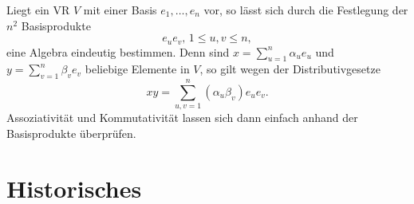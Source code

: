 \documentclass[aspectratio=169]{beamer}
\begin{document}
    \begin{frame}
        Liegt ein VR \(V\) mit einer Basis \(e_1, \dots, e_n\) vor, so lässt sich durch die Festlegung der \(n^2\) Basisprodukte
        \[
        e_u e_v,\, 1 \leq u, v \leq n,
        \]
        eine Algebra eindeutig bestimmen.
        Denn sind \(x = \sum_{u=1}^{n} \alpha_u e_u\) und  \(y = \sum_{v=1}^{n} \beta_v e_v\) beliebige Elemente in \(V\), so gilt wegen der Distributivgesetze
        \[
            xy = \sum_{u,v=1}^{n} (\alpha_u \beta_v) e_u e_v
        .\]
        Assoziativität und Kommutativität lassen sich dann einfach anhand der Basisprodukte überprüfen.
    \end{frame}


    \section{Historisches}
\end{document}
